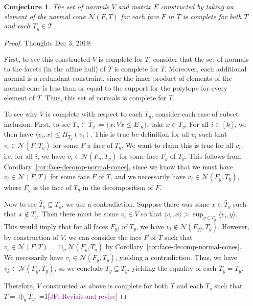 \documentclass[12pt]{article}
\newcommand{\Comments}{1}
\newcommand{\mynote}[2]{\ifnum\Comments=1\textcolor{#1}{#2}\fi}
\newcommand{\jessie}[1]{\mynote{purple}{[JF: #1]}}
\newcommand{\N}{\mathcal{N}}
\newcommand{\T}{\mathcal{T}}
\newcommand{\inprod}[2]{\langle #1, #2 \rangle}%
\newtheorem{conjecture}{Conjecture}
\begin{document}
  \begin{conjecture}
  	The set of normals $V$ and matrix $E$ constructed by taking an element of the normal cone $\N(F, T)$ for each face $F$ in $T$ is complete for both $T$ and each $T_y \in \T$.
  \end{conjecture}
  \begin{proof}
  	Thoughts Dec 3, 2019:
  	
  	First, to see this constructed $V$ is complete for $T$, consider that the set of normals to the facets (in the affine hull) of $T$ is complete for $T$.
  	Moreover, each additional normal is a redundant constraint, since the inner product of elements of the normal cone is less than or equal to the support for the polytope for every element of $T$.
  	Thus, this set of normals is complete for $T$.
  	
  	To see why $V$ is complete with respect to each $T_y$, consider each case of subset inclusion.
  	First,  to see $T_y \subset \bar T_y  := \{ x : Vx \leq E_{;y}\}$, take $x \in T_y$.
  	For all $i \in [k]$, we then have $\inprod{v_i}{x} \leq H_{T_y}(v_i)$.
  	This is true be definition for all $v_i$ such that $v_i \in \N(F, T_y)$ for some $F$ a face of $T_y$.
  	We want to claim this is true for all $v_i$, i.e. for all $i$, we have $v_i \in \N(F_y, T_y)$ for some face $F_y$ of $T_y$.
  	This follows from Corollary~\ref{cor:face-decomp-normal-cones}, since we know that we must have $v_i \in \N(F, T)$ for some face $F$ of $T$, and we necessarily have $v_i \in \N(F_y, T_y)$, where $F_y$ is the face of $T_y$ in the decomposition of $F$.
  	
  	Now to see $\bar T_y \subseteq T_y$, we use a contradiction.
  	Suppose there was some $x \in \bar T_y$ such that $x \not \in T_y$.
  	Then there must be some $v_i \in V$ so that $\inprod {v_i}{x} > \sup_{y \in T_y} \inprod{v_i}{y}$.
  	This would imply that for all faces $F_{yj}$ of $T_y$, we have $v_i \not \in \N(F_{yj}, T_y)$.
  	However, by construction of $V$, we can consider the face $F$ of $T$ such that $v_i \in \N(F,T) = \cap_y \N(F_y, T_y)$ by Corollary~\ref{cor:face-decomp-normal-cones}.
  	We necessarily have $v_i \in \N(F_y, T_y)$, yielding a contradiction.
  	Thus, we have $v_k \in \N(F_y, T_y)$, so we conclude $\bar T_y \subseteq T_y$, yielding the equality of each $\bar T_y = T_y$.
  	
  	Therefore, $V$ constructed as above is complete for both $T$ and each $T_y$ such that $T = \oplus_y T_y$.	
  	\jessie{Revisit and revise}
  \end{proof}
  
\end{document}
